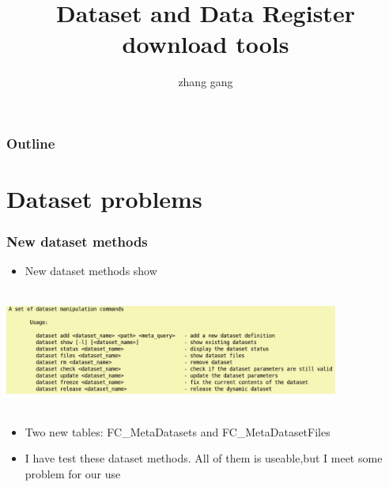 \documentclass{beamer}
\begin{document}
\title{Dataset and Data Register download tools}
\author{zhang gang}

\maketitle

\begin{frame}
      \frametitle{Outline}
      \tableofcontents
\end{frame}

\section{Dataset problems}
\begin{frame}
  \frametitle{New dataset methods}
  \begin{itemize}
    \item New dataset methods show
  \end{itemize}
  \hspace{0.5cm} 
  \includegraphics[height=4cm,width=11cm,keepaspectratio]{data/datasetMethod.png}
  \begin{itemize}
    \item Two new tables: FC\_MetaDatasets and FC\_MetaDatasetFiles
    \item I have test these dataset methods. All of them is useable,but I meet some problem for our use 
  \end{itemize}
\end{frame}
\end{document}
